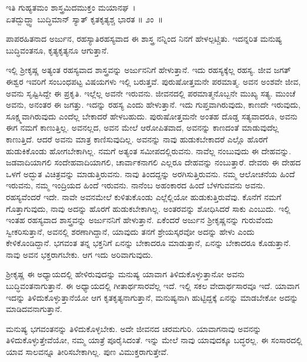 \begin{shloka}
ಇತಿ ಗುಹ್ಯತಮಂ ಶಾಸ್ತ್ರಮಿದಮುಕ್ತಂ ಮಯಾನಘ~।\\ಏತದ್ಬುದ್ಧ್ವಾ ಬುದ್ಧಿಮಾನ್ ಸ್ಯಾತ್ ಕೃತಕೃತ್ಯಶ್ಚ ಭಾರತ \hfill॥ ೨ಂ~॥
\end{shloka}

\begin{artha}
ಪಾಪರಹಿತನಾದ ಅರ್ಜುನ, ರಹಸ್ಯಾತಿರಹಸ್ಯವಾದ ಈ ಶಾಸ್ತ್ರ ನನ್ನಿಂದ ನಿನಗೆ ಹೇಳಲ್ಪಟ್ಚಿತು. ಇದನ್ನರಿತ ಮನುಷ್ಯ ಬುದ್ಧಿವಂತನೂ, ಕೃತ್ಯಕೃತ್ಯನೂ ಆಗುತ್ತಾನೆ.
\end{artha}

ಇಲ್ಲಿ ಶ‍್ರೀಕೃಷ್ಣ ಅತ್ಯಂತ ರಹಸ್ಯವಾದ ಶಾಸ್ತ್ರವನ್ನು ಅರ್ಜುನನಿಗೆ ಹೇಳುತ್ತಾನೆ. ಇದು ರಹಸ್ಯಕ್ಕೆಲ್ಲ ರಹಸ್ಯ. ಜೀವ ಜಗತ್ ಈಶ್ವರ ಇವರಿಗೆ ಸಂಬಂಧಪಟ್ಟ ವಿಷಯಗಳು ಇಲ್ಲಿ ಬರುತ್ತವೆ. ಪುರುಷೋತ್ತಮನೇ ಪರಮಾತ್ಮ. ಅವನ ಅಂಶವೇ ಜೀವ, ಅವನು ಸೃಷ್ಟಿಸಿದ್ದೇ ಈ ಪ್ರಕೃತಿ. ಇಲ್ಲೆಲ್ಲ ಅವನೇ ಇರುವನು. ಜೀವನದಲ್ಲಿ ಪರಮಾತ್ಮನೊಬ್ಬನೇ ಮುಖ್ಯ ಸತ್ಯ. ಮುಂಚೆ ಅವನು, ಅನಂತರ ಈ ಜಗತ್ತು. ಇದನ್ನು ರಹಸ್ಯ ಎಂದು ಹೇಳುತ್ತಾನೆ. ಇದು ಗುಪ್ತವಾಗಿರುವುದು, ಕಾಣದೇ ಇರುವುದು, ಸೂಕ್ಷ್ಮವಾಗಿರುವುದು ಎಂದೆಲ್ಲ ಬೇಕಾದರೆ ಹೇಳಬಹುದು. ಪುರುಷೋತ್ತಮನೇ ಅಂತಹ ದೊಡ್ಡ ಸತ್ಯವಾದರೂ, ಅವನು ಈಗ ನಮಗೆ ಕಾಣುತ್ತಿಲ್ಲ. ಅವನಲ್ಲದ, ಅವನ ಮೇಲೆ ಆರೋಪಿತವಾದ, ಅವನನ್ನು ಕಾಣದಂತೆ ಮಾಡುವುದೆಲ್ಲ ಕಾಣುತ್ತಿದೆ. ಆದರೆ ಅವನು ಮಾತ್ರ ಕಾಣಿಸುವುದಿಲ್ಲ. ಅವನನ್ನು ನಾವು ಹುಡುಕಬೇಕಾದರೆ ಎಲ್ಲೊ ಹೊರಗೆ ಹುಡುಕಿಕೊಂಡು ಹೋಗಬೇಕಾಗಿಲ್ಲ. ನಮಗೆ ಅತ್ಯಂತ ಸಮೀಪದಲ್ಲಿರುವನು. ನಾವೆಲ್ಲ ನಂಬುವುದು ಈ ದೇಹವನ್ನು. ಜಡವಾದಿಯಾಗಲಿ ಸಂದೇಹವಾದಿಯಾಗಲಿ, ಚಾರ್ವಾಕನಾಗಲಿ ಎಲ್ಲರೂ ದೇಹವನ್ನು ನಂಬುತ್ತಾರೆ. ದೇವರು ಈ ದೇಹದ ಒಳಗೆ ಅದ್ಭುತ ವಿಚಿತ್ರವನ್ನು ಮಾಡುತ್ತಿರುವನು. ನಾವು ತಿಂದದ್ದನ್ನು ಅರಗಿಸುತ್ತಿರುವನು. ನಮ್ಮ ಆಲೋಚನೆಯ ಹಿಂದೆ ಇರುವನು, ನಮ್ಮ ಇಂದ್ರಿಯದ ಹಿಂದೆ ಇರುವನು. ನಾನೆಂಬ ಅಹಂಕಾರದ ಹಿಂದೆ ಬೆಳಗುವವನು ಅವನು. ರಹಸ್ಯವೆಂದರೆ ಇದೇ. ನಾವೇ ಅವನಮೇಲೆ ಕುಳಿತುಕೊಂಡು ಎಲ್ಲೆಲ್ಲಿಯೋ ಹುಡುಕುತ್ತಿರುವೆವು. ಕೊನೆಗೆ ನಮಗೆ ಗೊತ್ತಾಗುವುದು, ನಾವು ಅದನ್ನು ಹೊರಗೆ ಹುಡುಕಬೇಕಾಗಿಲ್ಲ. ಅಂತರವನ್ನು ಶೋಧಿಸಿದರೆ ಸಾಕು ಎಂಬುದು. ಇಲ್ಲಿ ಇಂತಹ ರಹಸ್ಯವಾದ ಶಾಸ್ತ್ರವನ್ನು ಅರ್ಜುನನಿಗೆ ಹೇಳುತ್ತಾನೆ. ಏಕೆಂದರೆ ಅರ್ಜುನ ಶ‍್ರೀಕೃಷ್ಣನನ್ನು ಗುರುವೆಂದು ಸ್ವೀಕರಿಸುತ್ತಾನೆ, ಅವನಲ್ಲಿ ಶರಣಾಗಿದ್ದಾನೆ, ಯಾವುದು ತನಗೆ ಶ್ರೇಯಸ್ಕರವೋ ಅದನ್ನು ಹೇಳು ಎಂದು ಕೇಳಿಕೊಂಡಿದ್ದಾನೆ. ಭಗವಂತ ತನ್ನ ಭಕ್ತನಿಗೆ ಏನನ್ನು ಬೇಕಾದರೂ ಮಾಡುತ್ತಾನೆ, ಏನನ್ನು ಬೇಕಾದರೂ ಕೊಡುತ್ತಾನೆ. ನಾವು ಅವನ ಭಕ್ತರಾಗಬೇಕು. ಆಗ ಇದು ಅರಿವಾಗುವುದು.

ಶ‍್ರೀಕೃಷ್ಣ ಈ ಅಧ್ಯಾಯದಲ್ಲಿ ಹೇಳಿರುವುದನ್ನು ಮನುಷ್ಯ ಯಾವಾಗ ತಿಳಿದುಕೊಳ್ಳುತ್ತಾನೋ ಅವನು ಬುದ್ಧಿವಂತನಾಗುತ್ತಾನೆ. ಈ ಅಧ್ಯಾಯದಲ್ಲಿ ಗೀತಾರ್ಥಸಾರವೆಲ್ಲ ಇದೆ. ಇಲ್ಲಿ ಸಕಲ ವೇದಾರ್ಥಸಾರವೂ ಇದೆ. ಯಾವಾಗ ಇದನ್ನು ತಿಳಿದುಕೊಳ್ಳುತ್ತಾನೆಯೋ ಆಗ ಕೃತಕೃತ್ಯನಾಗುತ್ತಾನೆ, ಮನುಷ್ಯನಾಗಿ ಹುಟ್ಟಿದ್ದಕ್ಕೆ ಏನನ್ನು ಮಾಡಬೇಕೋ ಅದನ್ನು ಮಾಡಿದವನಾಗುತ್ತಾನೆ.

ಮನುಷ್ಯ ಭಗವಂತನನ್ನು ತಿಳಿದುಕೊಳ್ಳಬೇಕು. ಅದೇ ಜೀವನದ ಚರಮಗುರಿ. ಯಾವಾಗ\break ನಾವು ಅವನನ್ನು ತಿಳಿದುಕೊಳ್ಳುತ್ತೇವೆಯೋ, ನಮ್ಮ ಯಾತ್ರೆ ಪೂರೈಸಿದಂತೆ. ಇನ್ನು ಮೇಲೆ ನಾವು ಯಾವುದಕ್ಕೂ ಬದ್ಧರಲ್ಲ. ಈ ಸಂಸಾರದಲ್ಲಿ ಯಾವ ಸಾಲವನ್ನೂ ತೀರಿಸಬೇಕಾಗಿಲ್ಲ. ಪುಣ ವಿಮುಕ್ತರಾಗುತ್ತೇವೆ.

